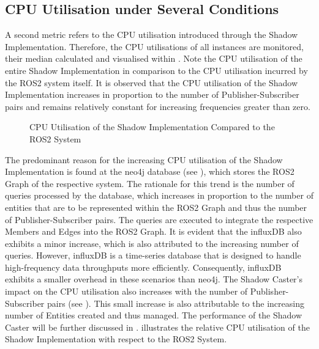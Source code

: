     \subsection{CPU Utilisation under Several Conditions} \label{subsec:evaluation:cpuutilisation}
    A second metric refers to the CPU utilisation introduced through the Shadow Implementation. Therefore, the CPU utilisations of all instances are monitored, their median calculated and visualised within . Note the CPU utilisation of the entire Shadow Implementation in comparison to the CPU utilisation incurred by the ROS2 system itself.\newline
    It is observed that the CPU utilisation of the Shadow Implementation increases in proportion to the number of Publisher-Subscriber pairs and remains relatively constant for increasing frequencies greater than zero.
    \begin{figure}[h]
        \centering
        
        \caption{CPU Utilisation of the Shadow Implementation Compared to the ROS2 System} \label{fig:tikz:eval:cpuUsage}
    \end{figure}
    The predominant reason for the increasing CPU utilisation of the Shadow Implementation is found at the neo4j database (see ), which stores the ROS2 Graph of the respective system. The rationale for this trend is the number of queries processed by the database, which increases in proportion to the number of entities that are to be represented within the ROS2 Graph and thus the number of Publisher-Subscriber pairs. The queries are executed to integrate the respective Members and Edges into the ROS2 Graph. It is evident that the influxDB also exhibits a minor increase, which is also attributed to the increasing number of queries. However, influxDB is a time-series database that is designed to handle high-frequency data throughputs more efficiently. Consequently, influxDB exhibits a smaller overhead in these scenarios than neo4j. The Shadow Caster's impact on the CPU utilisation also increases with the number of Publisher-Subscriber pairs (see ). This small increase is also attributable to the increasing number of Entities created and thus managed.\newline
    The performance of the Shadow Caster will be further discussed in .  illustrates the relative CPU utilisation of the Shadow Implementation with respect to the ROS2 System.



